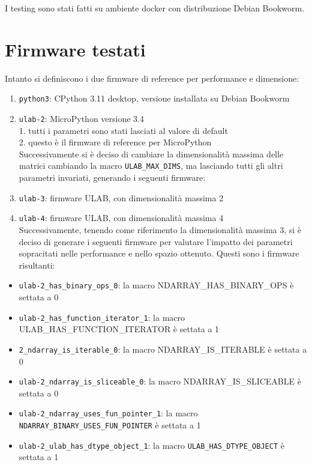 \documentclass[12pt,a4paper]{report}
\begin{document}
I testing sono stati fatti su ambiente docker con distribuzione Debian
Bookworm.\\

\section{Firmware testati}

Intanto si definiscono i due firmware di reference per performance e
dimensione:

\begin{enumerate}
\item
  \texttt{python3}: CPython 3.11 desktop, versione installata su Debian
  Bookworm
\item
  \texttt{ulab-2}: MicroPython versione 3.4\\
  1. tutti i parametri sono stati lasciati al valore di default\\
  2. questo è il firmware di reference per MicroPython\\
  Successivamente si è deciso di cambiare la dimensionalità massima
  delle matrici cambiando la macro \texttt{ULAB\_MAX\_DIMS}, ma
  lasciando tutti gli altri parametri invariati, generando i seguenti
  firmware:
\item
  \texttt{ulab-3}: firmware ULAB, con dimensionalità massima 2
\item
  \texttt{ulab-4}: firmware ULAB, con dimensionalità massima 4\\
  Successivamente, tenendo come riferimento la dimensionalità massima 3,
  si è deciso di generare i seguenti firmware per valutare
  l'impatto dei parametri sopracitati nelle performance
  e nello spazio ottenuto. Questi sono i firmware risultanti:
\end{enumerate}

\begin{itemize}
\item
  \texttt{ulab-2\_has\_binary\_ops\_0}: la macro
  NDARRAY\_HAS\_BINARY\_OPS è settata a 0
\item
  \texttt{ulab-2\_has\_function\_iterator\_1}: la macro
  ULAB\_HAS\_FUNCTION\_ITERATOR è settata a 1
\item
  \texttt{2\_ndarray\_is\_iterable\_0}: la macro NDARRAY\_IS\_ITERABLE è
  settata a 0
\item
  \texttt{ulab-2\_ndarray\_is\_sliceable\_0}: la macro
  NDARRAY\_IS\_SLICEABLE è settata a 0
\item
  \texttt{ulab-2\_ndarray\_uses\_fun\_pointer\_1}: la macro
  \texttt{NDARRAY\_BINARY\_USES\_FUN\_POINTER} è settata a 1
\item
  \texttt{ulab-2\_ulab\_has\_dtype\_object\_1}: la macro
  \texttt{ULAB\_HAS\_DTYPE\_OBJECT} è settata a 1
\end{itemize}
\end{document}
